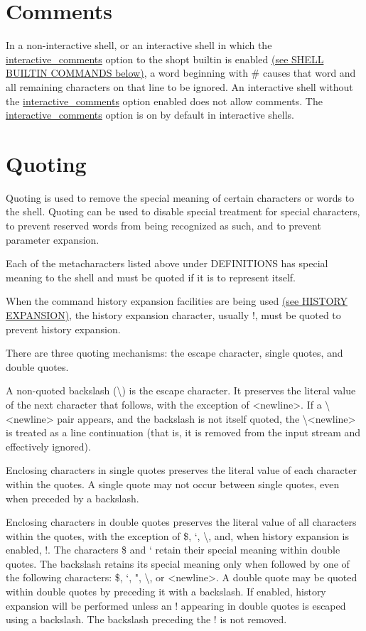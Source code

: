 \documentclass[11pt]{article}
\begin{document}
\section{Comments}\label{sec:comments}
In a non-interactive shell, or an interactive shell in which the \url{interactive_comments} option to the shopt builtin is enabled \hyperref[sec:shellbuiltincommands]{(see SHELL BUILTIN COMMANDS below)}, a word beginning with \# causes that word and all remaining characters on that line to be ignored. An interactive shell without the \url{interactive_comments} option enabled does not allow comments. The \url{interactive_comments} option is on by default in interactive shells.

\section{Quoting}
\label{quoting}
Quoting is used to remove the special meaning of certain characters or words to the shell. Quoting can be used to disable special treatment for special characters, to prevent reserved words from being recognized as such, and to prevent parameter expansion.

Each of the metacharacters listed above under DEFINITIONS has special meaning to the shell and must be quoted if it is to represent itself.

When the command history expansion facilities are being used \hyperref[sec:historyexpansion]{(see HISTORY EXPANSION)}, the history expansion character, usually !, must be quoted to prevent history expansion.

There are three quoting mechanisms: the escape character, single quotes, and double quotes.

A non-quoted backslash (\textbackslash) is the escape character. It preserves the literal value of the next character that follows, with the exception of <newline>. If a \textbackslash<newline> pair appears, and the backslash is not itself quoted, the \textbackslash<newline> is treated as a line continuation (that is, it is removed from the input stream and effectively ignored).

Enclosing characters in single quotes preserves the literal value of each character within the quotes. A single quote may not occur between single quotes, even when preceded by a backslash.

Enclosing characters in double quotes preserves the literal value of all characters within the quotes, with the exception of \$, `, \textbackslash, and, when history expansion is enabled, !. The characters \$ and ` retain their special meaning within double quotes. The backslash retains its special meaning only when followed by one of the following characters: \$, `, ", \textbackslash, or <newline>. A double quote may be quoted within double quotes by preceding it with a backslash. If enabled, history expansion will be performed unless an ! appearing in double quotes is escaped using a backslash. The backslash preceding the ! is not removed.
\end{document}
